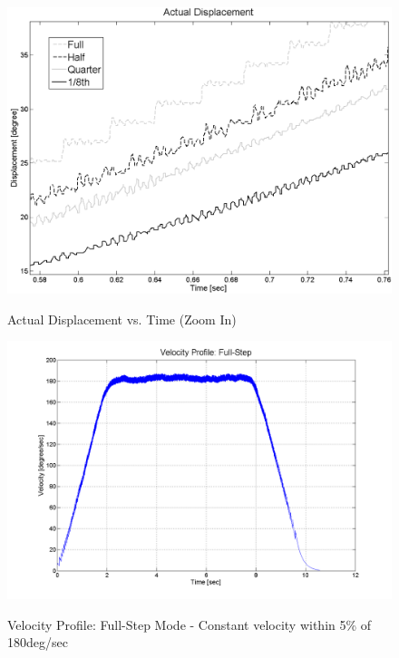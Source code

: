 \documentclass{article}
\theoremstyle{plain}
\theoremstyle{definition}
\theoremstyle{remark}
\begin{document}
\begin{figure}[h]
\begin{center}
\includegraphics[width=12cm]{Q4_ActualPosition_L.png}
\caption{Actual Displacement vs. Time (Zoom In)} \label{tex}
\label{fig:q4_10}
\end{center}
\end{figure}

\begin{figure}[h!]
\begin{center}
\includegraphics[width=12cm]{Q4_full_step.png}
\caption{Velocity Profile: Full-Step Mode - Constant velocity within 5\% of 180deg/sec} \label{tex}
\label{fig:q4_11}
\end{center}
\end{figure}
\end{document}
